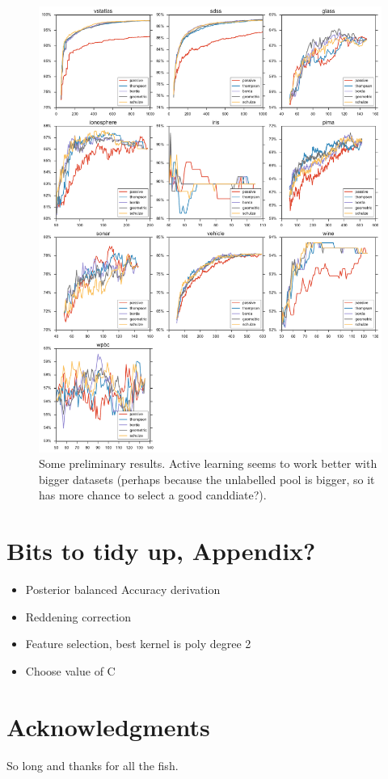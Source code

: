 \documentclass[fleqn,10pt,lineno]{wlpeerj} %
\begin{document}
\begin{figure}[tbp]
	\centering
	\includegraphics[width=\textwidth]{figures/learning_curves}
	\caption[Some preliminary results.]{Some preliminary results. Active learning seems
    		 to work better with bigger datasets (perhaps because the unlabelled pool
             is bigger, so it has more chance to select a good canddiate?). }
	\label{fig:learning_curves}
\end{figure}


\section*{Bits to tidy up, Appendix?}
\begin{itemize}
  \item Posterior balanced Accuracy derivation
  \item Reddening correction
  \item Feature selection, best kernel is poly degree 2
  \item Choose value of C
\end{itemize}


\section*{Acknowledgments}

So long and thanks for all the fish.


\end{document}
